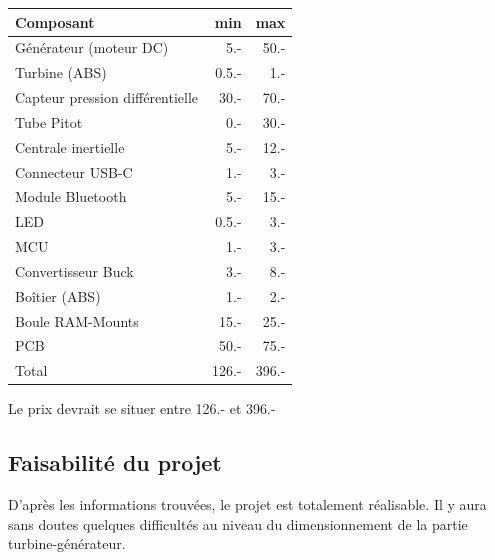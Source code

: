     \begin{table}[h!]
    \centering
    \begin{tabular}{| l || r | r |}
        \hline
            Composant & min & max \\
            \hline
            Générateur (moteur DC) & 5.- & 50.- \\
            Turbine (ABS) & 0.5.- & 1.- \\
            Capteur pression différentielle & 30.- & 70.- \\
            Tube Pitot & 0.- & 30.- \\
            Centrale inertielle & 5.- & 12.- \\
            Connecteur USB-C & 1.- & 3.- \\
            Module Bluetooth & 5.- & 15.- \\
            LED & 0.5.- & 3.- \\
            MCU & 1.- & 3.- \\
            Convertisseur Buck & 3.- & 8.- \\
            Boîtier (ABS) & 1.- & 2.- \\
            Boule RAM-Mounts & 15.- & 25.- \\
            PCB & 50.- & 75.- \\
            \hline
            Total & 126.- & 396.-\\
        \hline
     \end{tabular} 
     \end{table}
    Le prix devrait se situer entre 126.- et 396.-
    \vspace{1cm}

\subsection{Faisabilité du projet}
    D'après les informations trouvées, le projet est totalement réalisable. Il y aura sans doutes quelques difficultés au niveau du dimensionnement de la partie turbine-générateur.
    \newpage